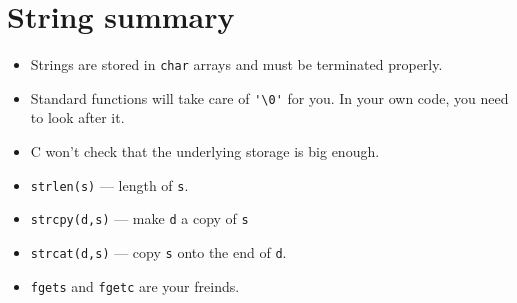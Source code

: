 \section*{String summary}
\begin{itemize}
 \item Strings are stored in \texttt{char} arrays and must be terminated properly.
 \item Standard functions will take care of \lstinline!'\0'! for you. In your own code, you need to look after it.
 \item C won't check that the underlying storage is big enough.
 \item \texttt{strlen(s)} --- length of \texttt{s}.
 \item \texttt{strcpy(d,s)} --- make \texttt{d} a copy of \texttt{s}
 \item \texttt{strcat(d,s)} --- copy \texttt{s} onto the end of \texttt{d}.
 \item \texttt{fgets} and \texttt{fgetc} are your freinds.
\end{itemize}
